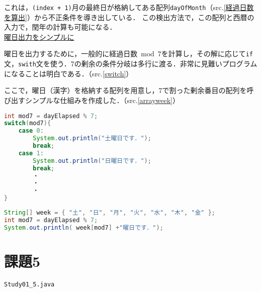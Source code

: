 \documentclass[a4j,11pt]{jsarticle}
\begin{document}
これは，\verb|(index + 1)|月の最終日が格納してある配列\verb|dayOfMonth|（src.\ref{経過日数を算出}）から不正条件を導き出している．
この検出方法で，この配列と西暦の入力で，閏年の計算も可能になる．\\
\noindent\underline{曜日出力をシンプルに}\par
曜日を出力するために，一般的に\(\textrm{経過日数}\bmod 7\)を計算し，その解に応じて\verb|if|文，\verb|swith|文を使う．$7$の剰余の条件分岐は多行に渡る．非常に見難いプログラムになることは明白である．（src.\ref{switch}）\par
ここで，曜日（漢字）を格納する配列を用意し，$7$で割った剰余番目の配列を呼び出すシンプルな仕組みを作成した．（src.\ref{arrayweek}）
\begin{lstlisting}[caption=\ttfamily{switch}\normalfont 文を用いたコード例, label=switch, language=Java]
int mod7 = dayElapsed % 7;
switch(mod7){
    case 0:
        System.out.println("土曜日です．");
        break;
    case 1:
        System.out.println("日曜日です．");
        break;
        ・
        ・
        ・
}
\end{lstlisting}
\begin{lstlisting}[caption=配列を用いたコード例, label=arrayweek, language=Java]
String[] week = { "土", "日", "月", "火", "水", "木", "金" };
int mod7 = dayElapsed % 7;
System.out.println( week[mod7] +"曜日です．");
\end{lstlisting}
\newpage
\setcounter{section}{5}
\setcounter{subsection}{0}

\section*{課題5}
\noindent{}\hspace{1em}\verb|Study01_5.java|\\
\end{document}
